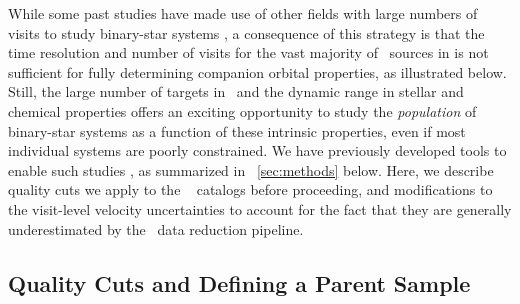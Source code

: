 \documentclass[modern]{aastex63}
\begin{document}
While some past studies have made use of other fields with large numbers of
visits to study binary-star systems \citep{Troup:2016, Fernandez-Trincado:2019},
a consequence of this strategy is that the time resolution and number of visits
for the vast majority of \apogee\ sources in  is not sufficient for fully
determining companion orbital properties, as illustrated below.
Still, the large number of targets in \apogee\ and the dynamic range in stellar
and chemical properties offers an exciting opportunity to study the
\emph{population} of binary-star systems as a function of these intrinsic
properties, even if most individual systems are poorly constrained.
We have previously developed tools to enable such studies \citep{thejoker}, as
summarized in \sectionname~\ref{sec:methods} below.
Here, we describe quality cuts we apply to the \apogee\  catalogs before
proceeding, and modifications to the visit-level velocity uncertainties to
account for the fact that they are generally underestimated by the \apogee\ data
reduction pipeline.

\subsection{Quality Cuts and Defining a Parent Sample}
\end{document}
